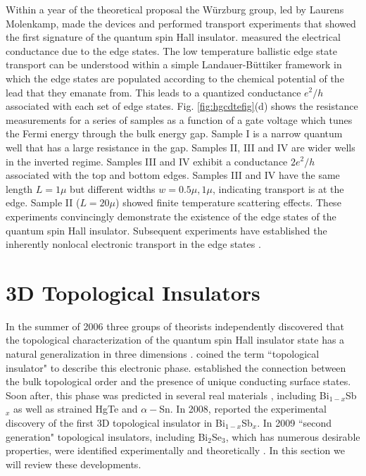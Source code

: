 \documentclass[twocolumn,floatfix,showpacs,rmp,aps]{revtex4}
\begin{document}
	
	Within a year of the theoretical proposal the W\"urzburg group, led by Laurens
	Molenkamp, made the devices and performed transport experiments that
	showed the first signature of the quantum spin Hall insulator.
	\textcite{konig07}
	measured the electrical conductance due to the edge states.
	The low temperature ballistic edge state transport
	can be understood within a simple Landauer-B\"uttiker
	\cite{buttiker88}
	framework in which the edge states are populated according to the
	chemical potential of the lead that they emanate from.  This leads to
	a quantized conductance $e^2/h$ associated with each set of edge
	states.  Fig. \ref{fig:hgcdtefig}(d) shows the resistance measurements for a series of
	samples as a function of a gate voltage which tunes the Fermi energy
	through the bulk energy gap.  Sample I is a narrow quantum well
	that has a large resistance in the gap.  Samples II, III and IV are
	wider wells in the inverted regime.   Samples III and IV exhibit a
	conductance $2e^2/h$ associated with the top and bottom edges.  Samples III and IV have
	the same length $L = 1\mu$ but different widths
	$w = 0.5\mu,1\mu$, indicating transport is at the edge.  Sample
	II  ($L=20\mu$) showed finite temperature scattering effects. These
	experiments convincingly demonstrate the existence of the edge
	states of the quantum spin Hall insulator.  Subsequent
	experiments have established the inherently nonlocal electronic
	transport in the edge states \cite{roth09}.
	
	
	\section{3D Topological Insulators}
	\label{sec:3d}
	
	In the summer of 2006 three groups of theorists independently discovered that the
	topological characterization of the quantum spin Hall insulator state
	has a natural generalization in three dimensions \cite{fukanemele07,moorebalents07,roy09b}.
	\textcite{moorebalents07} coined the term ``topological
	insulator" to describe this electronic phase.  \textcite{fukanemele07} established the
	connection between the bulk topological order and the presence of unique conducting surface
	states.  Soon after, this phase was predicted in several real materials \cite{fukane07}, including
	Bi$_{1-x}$Sb$_x$ as well as strained HgTe and $\alpha-$Sn.  In 2008, \textcite{hsieh08}
	reported the experimental discovery of the first 3D topological
	insulator in Bi$_{1-x}$Sb$_x$.  In 2009 ``second generation" topological
	insulators, including Bi$_2$Se$_3$, which has numerous desirable properties,
	were identified experimentally \cite{xia09a} and theoretically \cite{xia09a,zhangh09}.
	In this section we will review these developments.
	
\end{document}
